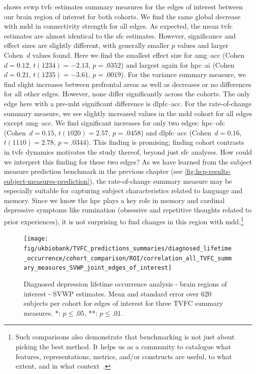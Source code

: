  shows \gls{svwp} \gls{tvfc} estimates summary measures for the edges of interest between our brain region of interest for both cohorts.
%
We find the same global decrease with \gls{mdd} in connectivity strength for all edges.
As expected, the mean \gls{tvfc} estimates are almost identical to the \gls{sfc} estimates.
However, significance and effect sizes are slightly different, with generally smaller $p$ values and larger Cohen~$d$ values found.
Here we find the smallest effect size for \gls{amg}--\gls{acc} (Cohen~$d = 0.12$, $t(1234) = -2.13$, $p = .0352$) and largest again for \gls{hpc}--\gls{ai} (Cohen~$d = 0.21$, $t(1235) = -3.61$, $p = .0019$).
%
For the variance summary measure, we find slight increases between prefrontal areas as well as decreases or no differences for all other edges.
However, none differ significantly across the cohorts.
The only edge here with a pre-\gls{mht} significant difference is \gls{dlpfc}--\gls{acc}.
%
For the rate-of-change summary measure, we see slightly increased values in the \gls{mdd} cohort for all edges except \gls{amg}--\gls{acc}.
We find significant increases for only two edges: \gls{hpc}--\gls{ofc} (Cohen~$d = 0.15$, $t(1020) = 2.57$, $p = .0458$) and \gls{dlpfc}--\gls{acc} (Cohen~$d = 0.16$, $t(1110) = 2.78$, $p = .0344$).
This finding is promising; finding cohort contrasts in \gls{tvfc} dynamics motivates the study thereof, beyond just \gls{sfc} analyses.
How could we interpret this finding for these two edges?
As we have learned from the subject measure prediction benchmark in the previous chapter (see \cref{fig:hcp-results-subject-measures-prediction}), the rate-of-change summary measure may be especially suitable for capturing subject characteristics related to language and memory.
Since we know the \gls{hpc} plays a key role in memory and cardinal depressive symptoms like rumination (obsessive and repetitive thoughts related to prior experiences), it is not surprising to find changes in this region with \gls{mdd}.\footnote{Such comparisons also demonstrate that benchmarking is not just about picking the best method. It helps us as a community to catalogue what features, representations, metrics, and/or constructs are useful, to what extent, and in what context~\parencite[see also][]{Voytek2022}.}


\begin{figure}[t]
  \centering
  \texttt{[image: fig/ukbiobank/TVFC\_predictions\_summaries/diagnosed\_lifetime\_occurrence/cohort\_comparison/ROI/correlation\_all\_TVFC\_summary\_measures\_SVWP\_joint\_edges\_of\_interest]}
  \caption{
    Diagnosed depression lifetime occurrence analysis - brain regions of interest - SVWP estimates.
    Mean and standard error over 620 subjects per cohort for edges of interest for three TVFC summary measures.
    *: $p \leq .05$, **: $p \leq .01$.
  }\label{fig:ukb-results-dlo-roi-cohort-comparison-edges-of-interest-wp}
\end{figure}


